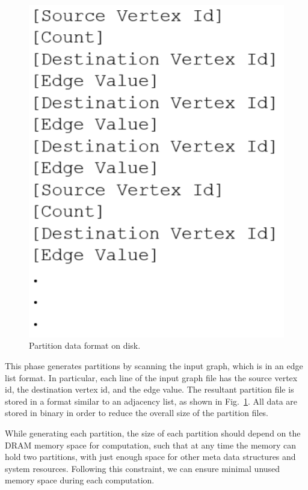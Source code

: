 \documentclass[10pt,preprint]{sigplanconf}
\begin{document}
\begin{figure}[!htbp]
	\begin{center}
		\includegraphics[scale=0.5]{Figures/partfmt.pdf}
	\end{center}
	\caption{Partition data format on disk.}
	\label{fig-partfmt}
\end{figure}

This phase generates partitions by scanning the input graph, which is in an edge list format. In particular, each line of the input graph file has the source vertex id, the destination vertex id, and the edge value. The resultant partition file is stored in a format similar to an adjacency list, as shown in Fig.~\ref{fig-partfmt}. All data are stored in binary in order to reduce the overall size of the partition files.

While generating each partition, the size of each partition should depend on the DRAM memory space for computation, such that at any time the memory can hold two partitions, with just enough space for other meta data structures and system resources. Following this constraint, we can ensure minimal unused memory space during each computation. 
\end{document}
